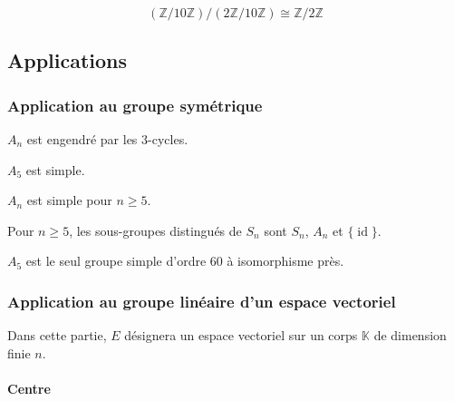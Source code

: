 	\begin{example}
		\[ (\mathbb{Z}/10\mathbb{Z})/(2\mathbb{Z}/10\mathbb{Z}) \cong \mathbb{Z}/2\mathbb{Z} \]
	\end{example}
	
	\subsection{Applications}
	
	\subsubsection{Application au groupe symétrique}
	
	
	\begin{lemma}
		$A_n$ est engendré par les $3$-cycles.
	\end{lemma}
	
	
	\begin{lemma}
		$A_5$ est simple.
	\end{lemma}
	
	
	\begin{theorem}
		$A_n$ est simple pour $n \geq 5$.
	\end{theorem}
	
	\begin{corollary}
		Pour $n \geq 5$, les sous-groupes distingués de $S_n$ sont $S_n$, $A_n$ et $\{\operatorname{id}\}$.
	\end{corollary}
	
	
	\begin{application}
		$A_5$ est le seul groupe simple d'ordre $60$ à isomorphisme près.
	\end{application}
	
	\subsubsection{Application au groupe linéaire d'un espace vectoriel}
	
	Dans cette partie, $E$ désignera un espace vectoriel sur un corps $\mathbb{K}$ de dimension finie $n$.
	
	\paragraph{Centre}
	

